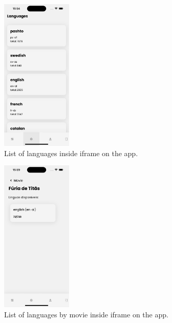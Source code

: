 \documentclass[12pt]{article}
\begin{document}
  \begin{figure}[h]
    \centering
    \caption{
     List of languages inside iframe on the app.
    }
    \label{fig:app3}
    \includegraphics[width=0.3\textwidth]{assets/16.png}
  \end{figure}


  \begin{figure}[h]
    \centering
    \caption{
     List of languages by movie inside iframe on the app.
    }
    \label{fig:app4}
    \includegraphics[width=0.3\textwidth]{assets/17.png}
  \end{figure}
\end{document}
